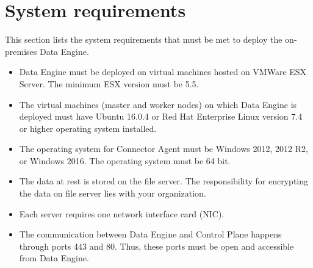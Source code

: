 \documentclass[letterpaper,10pt,english]{sphinxmanual}
\begin{document}
\chapter{System requirements}
\label{\detokenize{on_prem_dp_install_mcdmp:sys-req}}\label{\detokenize{on_prem_dp_install_mcdmp:system-requirements}}
This section lists the system requirements that must be met to deploy the on-premises Data Engine.
\begin{itemize}
\item {} 
Data Engine must be deployed on virtual machines hosted on VMWare ESX Server. The minimum ESX version must be 5.5.

\item {} 
The virtual machines (master and worker nodes) on which Data Engine is deployed must have Ubuntu 16.0.4 or Red Hat Enterprise Linux version 7.4 or
higher operating system installed.

\item {} 
The operating system for Connector Agent must be Windows 2012, 2012 R2, or Windows 2016. The operating system must be 64 bit.

\item {} 
The data at rest is stored on the file server. The responsibility for encrypting the data on file server lies with your organization.

\item {} 
Each server requires one network interface card (NIC).

\item {} 
The communication between Data Engine and Control Plane happens through ports 443 and 80. Thus, these ports must be open and accessible from Data
Engine.

\end{itemize}
\end{document}
